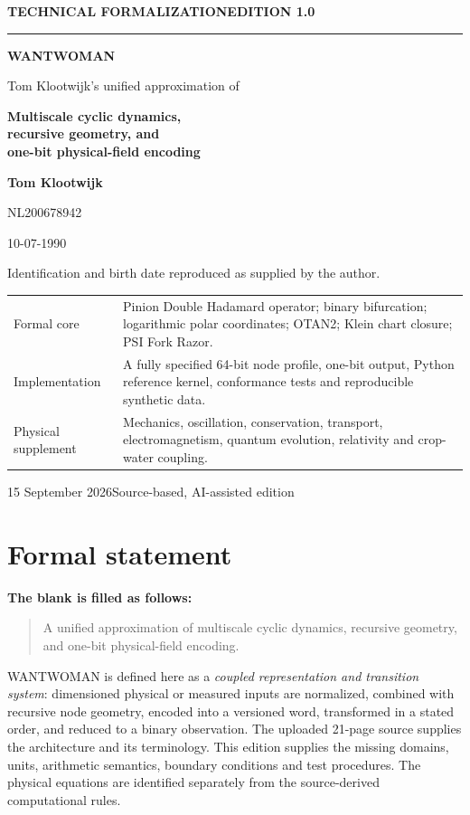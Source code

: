 \documentclass[11pt,a4paper]{article}
\numberwithin{equation}{section}
\begin{document}
\begin{titlepage}
\thispagestyle{empty}
{\sffamily\small\bfseries TECHNICAL FORMALIZATION\hfill EDITION 1.0}
\vspace{18mm}
{\color{ink}\rule{\textwidth}{1.4pt}}
\vspace{7mm}
{\sffamily\bfseries\fontsize{40}{45}\selectfont WANTWOMAN\par}
\vspace{9mm}
{\sffamily\Large Tom Klootwijk's unified approximation of\par}
\vspace{4mm}
{\sffamily\LARGE\bfseries Multiscale cyclic dynamics,\\[2mm]
recursive geometry, and\\[2mm]
one-bit physical-field encoding\par}
\vspace{12mm}
{\large\bfseries Tom Klootwijk\par}
{\large NL200678942\par}
{\large 10-07-1990\par}
\vspace{4mm}
{\small Identification and birth date reproduced as supplied by the author.}
\vfill
\begin{tabularx}{\textwidth}{@{}p{37mm}Y@{}}
\toprule
Formal core & Pinion Double Hadamard operator; binary bifurcation; logarithmic polar coordinates; OTAN2; Klein chart closure; PSI Fork Razor.\\
Implementation & A fully specified 64-bit node profile, one-bit output, Python reference kernel, conformance tests and reproducible synthetic data.\\
Physical supplement & Mechanics, oscillation, conservation, transport, electromagnetism, quantum evolution, relativity and crop-water coupling.\\
\bottomrule
\end{tabularx}
\vspace{8mm}
{\sffamily\small 15 September 2026\hfill Source-based, AI-assisted edition}
\end{titlepage}

\section*{Formal statement}
\textbf{The blank is filled as follows:}
\begin{quote}
\large A unified approximation of multiscale cyclic dynamics, recursive geometry, and one-bit physical-field encoding.
\end{quote}
WANTWOMAN is defined here as a \emph{coupled representation and transition system}: dimensioned physical or measured inputs are normalized, combined with recursive node geometry, encoded into a versioned word, transformed in a stated order, and reduced to a binary observation. The uploaded 21-page source supplies the architecture and its terminology. This edition supplies the missing domains, units, arithmetic semantics, boundary conditions and test procedures. The physical equations are identified separately from the source-derived computational rules.
\end{document}
